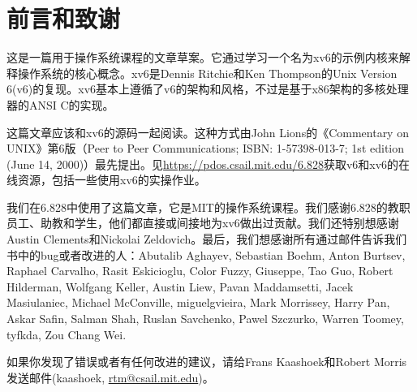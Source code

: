 \chapter*{前言和致谢}

这是一篇用于操作系统课程的文章草案。它通过学习一个名为xv6的示例内核来解释操作系统的核心概念。xv6是Dennis Ritchie和Ken Thompson的Unix Version 6(v6)的复现。xv6基本上遵循了v6的架构和风格，不过是基于x86架构的多核处理器的ANSI C的实现。

这篇文章应该和xv6的源码一起阅读。这种方式由John Lions的《Commentary on UNIX》第6版（Peer to Peer Communications; ISBN: 1-57398-013-7; 1st edition (June 14, 2000)）最先提出。见\url{https://pdos.csail.mit.edu/6.828}获取v6和xv6的在线资源，包括一些使用xv6的实操作业。

我们在6.828中使用了这篇文章，它是MIT的操作系统课程。我们感谢6.828的教职员工、助教和学生，他们都直接或间接地为xv6做出过贡献。我们还特别想感谢Austin Clements和Nickolai Zeldovich。最后，我们想感谢所有通过邮件告诉我们书中的bug或者改进的人：Abutalib Aghayev, Sebastian Boehm, Anton Burtsev, Raphael Carvalho, Rasit Eskicioglu, Color Fuzzy, Giuseppe, Tao Guo, Robert Hilderman, Wolfgang Keller, Austin Liew, Pavan Maddamsetti, Jacek Masiulaniec, Michael McConville, miguelgvieira, Mark Morrissey, Harry Pan, Askar Safin, Salman Shah, Ruslan Savchenko, Pawel Szczurko, Warren Toomey, tyfkda, Zou Chang Wei.

如果你发现了错误或者有任何改进的建议，请给Frans Kaashoek和Robert Morris发送邮件(kaashoek, \url{rtm@csail.mit.edu})。
